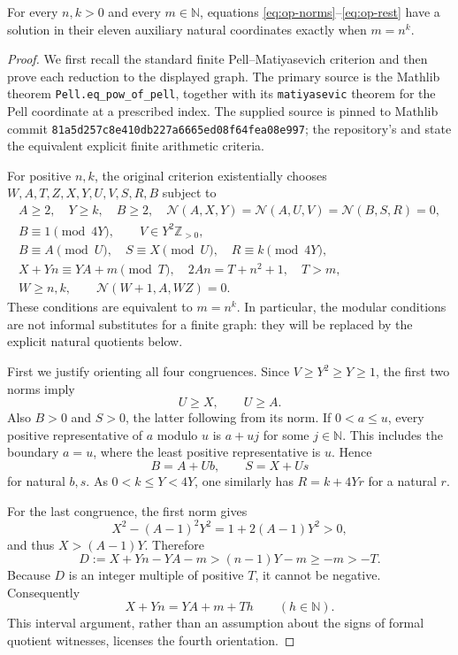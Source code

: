 \begin{theorem}
\label{thm:positive-power11}
For every $n,k>0$ and every $m\in\mathbb N$, equations
\eqref{eq:op-norms}--\eqref{eq:op-rest} have a solution in their eleven
auxiliary natural coordinates exactly when $m=n^k$.
\end{theorem}

\begin{proof}
We first recall the standard finite Pell--Matiyasevich criterion and then
prove each reduction to the displayed graph. The primary source is the
Mathlib theorem \texttt{Pell.eq\_pow\_of\_pell}, together with its
\texttt{matiyasevic} theorem for the Pell coordinate at a prescribed
index. The supplied source is pinned to Mathlib commit
\texttt{81a5d257c8e410db227a6665ed08f64fea08e997}; the repository's
 and 
state the equivalent explicit finite arithmetic criteria.

For positive $n,k$, the original criterion existentially chooses
$W,A,T,Z,X,Y,U,V,S,R,B$ subject to
\begin{gather*}
 A\ge2,\quad Y\ge k,\quad B\ge2,\quad
 \mathcal N(A,X,Y)=\mathcal N(A,U,V)=\mathcal N(B,S,R)=0,\\
 B\equiv1\pmod{4Y},\qquad V\in Y^2\mathbb Z_{>0},\\
 B\equiv A\pmod U,\quad S\equiv X\pmod U,
       \quad R\equiv k\pmod{4Y},\\
 X+Yn\equiv YA+m\pmod T,\quad
 2An=T+n^2+1,\quad T>m,\\
 W\ge n,k,\qquad \mathcal N(W+1,A,WZ)=0.
\end{gather*}
These conditions are equivalent to $m=n^k$. In particular, the modular
conditions are not informal substitutes for a finite graph: they will
be replaced by the explicit natural quotients below.

First we justify orienting all four congruences. Since
$V\ge Y^2\ge Y\ge1$, the first two norms imply
\[
 U\ge X,\qquad U\ge A.
\]
Also $B>0$ and $S>0$, the latter following from its norm. If
$0<a\le u$, every positive representative of $a$ modulo $u$ is
$a+u j$ for some $j\in\mathbb N$. This includes the boundary $a=u$,
where the least positive representative is $u$. Hence
\[
 B=A+Ub,\qquad S=X+Us
\]
for natural $b,s$. As $0<k\le Y<4Y$, one similarly has
$R=k+4Yr$ for a natural $r$.

For the last congruence, the first norm gives
\[
 X^2-(A-1)^2Y^2=1+2(A-1)Y^2>0,
\]
and thus $X>(A-1)Y$. Therefore
\[
 D:=X+Yn-YA-m>(n-1)Y-m\ge-m>-T.
\]
Because $D$ is an integer multiple of positive $T$, it cannot be
negative. Consequently
\begin{equation}\label{eq:power-natural-quotient}
 X+Yn=YA+m+Th\qquad(h\in\mathbb N).
\end{equation}
This interval argument, rather than an assumption about the signs of
formal quotient witnesses, licenses the fourth orientation.


\end{proof}
